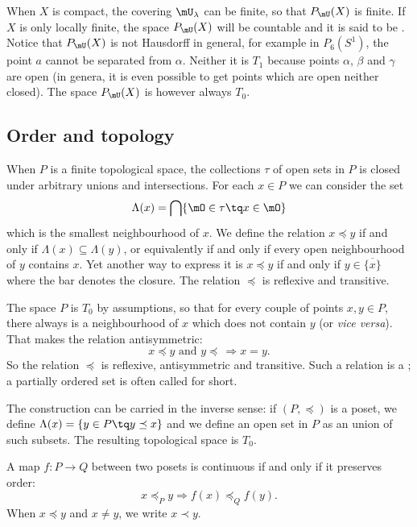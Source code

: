 When $X$ is compact, the covering $\mU_{\lambda}$ can be finite, so that $P_{\mU}(X)$ is finite. If $X$ is only locally finite, the space $P_{\mU}(X)$ will be countable and it is said to be . Notice that $P_{\mU}(X)$ is not Hausdorff in general, for example in $P_6(S^1)$, the point $a$ cannot be separated from $\alpha$. Neither it is $T_1$ because points $\alpha$, $\beta$ and $\gamma$ are open (in genera, it is even possible to get points which are open neither closed). The space $P_{\mU}(X)$ is however always $T_0$.

\subsection{Order and topology}

When $P$ is a finite topological space, the collections $\tau$ of open sets in $P$ is closed under arbitrary unions and intersections. For each $x\in P$ we can consider the set
\begin{equation}
	\Lambda(x)=\bigcap\{ \mO\in\tau\tq x\in\mO \}
\end{equation}
which is the smallest neighbourhood of $x$. We define the relation $x\preceq y$ if and only if $\Lambda(x)\subseteq\Lambda(y)$, or equivalently if and only if every open neighbourhood of $y$ contains $x$. Yet another way to express it is $x\preceq y$ if and only if $y\in\overline{\{ x \}}$ where the bar denotes the closure. The relation $\preceq$ is reflexive and transitive.

The space $P$ is $T_0$ by assumptions, so that for every couple of points $x,y\in P$, there always is a neighbourhood of $x$ which does not contain $y$ (or \emph{vice versa}). That makes the relation antisymmetric:
\[
	x\preceq y\text{ and }y\preceq\,\Rightarrow x=y.
\]
So the relation $\preceq$ is reflexive, antisymmetric and transitive. Such a relation is a ; a partially ordered set is often called  for short.

The construction can be carried in the inverse sense: if $(P,\preceq)$ is a poset, we define $\Lambda(x)=\{ y\in P\tq y\preceq x \}$ and we define an open set in $P$ as an union of such subsets. The resulting topological space is $T_0$.

A map $f\colon P\to Q$ between two posets is continuous if and only if it preserves order:
\begin{equation}
	x\preceq_Py\Rightarrow f(x)\preceq_Q f(y).
\end{equation}
When $x\preceq y$ and $x\neq y$, we write $x\prec y$.

